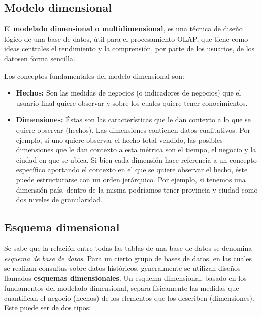 \documentclass[a4paper,11pt]{article}
\begin{document}
    
    \subsection{Modelo dimensional} \label{mod_dimensional}
    
    El \textbf{modelado dimensional o multidimensional}, es una técnica de diseño lógico de una base de datos, útil para el procesamiento OLAP, que tiene
    como ideas centrales el rendimiento y la comprensión, por parte de los usuarios, de los datosen forma sencilla.
    
    Los conceptos fundamentales del modelo dimensional son:
    
    \begin{itemize}
      \item \textbf{Hechos:} Son las medidas de negocios (o indicadores de negocios) que el usuario final quiere observar y sobre los cuales quiere tener
      conocimientos.
      \item \textbf{Dimensiones:} Éstas son las características que le dan contexto a lo que se quiere observar (hechos).
      Las dimensiones contienen datos cualitativos. Por ejemplo, si uno quiere observar el hecho total 
      vendido, las posibles dimensiones que le dan contexto a esta métrica son el tiempo, el negocio y la ciudad en que se ubica. Si bien cada dimensión hace
      referencia a un concepto específico aportando el contexto en el que se quiere observar el hecho, éste puede estructurarse con un orden jerárquico.
      Por ejemplo, si tenemos una dimensión país, dentro de la misma podríamos tener provincia y ciudad como dos niveles de granularidad. 
    \end{itemize}
    
    
    \subsection{Esquema dimensional}
    
    Se sabe que la relación entre todas las tablas de una base de datos se denomina \textit{esquema de base de datos}. Para un cierto grupo de bases de datos, en las
    cuales se realizan consultas sobre datos históricos, generalmente se utilizan diseños llamados \textbf{esquemas dimensionales}. Un esquema dimensional,
    basado en los fundamentos del modelado dimensional, separa físicamente las medidas que cuantifican el negocio (hechos) de los elementos que los describen
    (dimensiones). Este puede ser de dos tipos:
    
\end{document}
